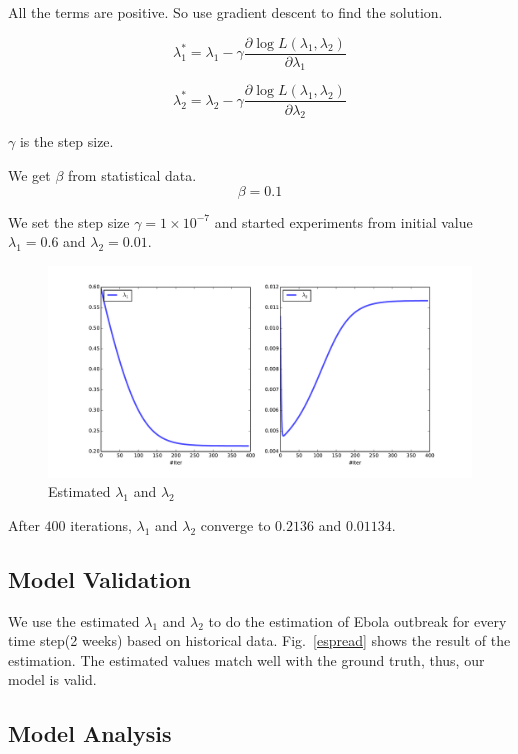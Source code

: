 \documentclass[12pt]{article}
\begin{document}
All the terms are positive. So use gradient descent to find the solution.

$$\lambda_1^* = \lambda_1 - \gamma \frac{\partial \log L(\lambda_1, \lambda_2)}{\partial \lambda_1}$$

$$\lambda_2^* = \lambda_2 - \gamma \frac{\partial \log L(\lambda_1, \lambda_2)}{\partial \lambda_2}$$

$\gamma$ is the step size.

We get $\beta$ from statistical data. $$\beta = 0.1$$ 

We set the step size $\gamma = 1\times 10^{-7}$ and started experiments from initial value $\lambda_1 = 0.6$ and $\lambda_2 = 0.01$.

\begin{figure}[hbt]
\begin{center}
  \includegraphics[width=6in]{graph/iter.pdf}
  \caption{Estimated $\lambda_1$ and $\lambda_2$}
  \label{est2}
\end{center}  
\end{figure}

After $400$ iterations, $\lambda_1$ and $\lambda_2$ converge to $0.2136$ and $0.01134$.

\subsection{Model Validation}

We use the estimated $\lambda_1$ and $\lambda_2$ to do the estimation of Ebola outbreak for every time step(2 weeks) based on historical data. Fig.~\ref{espread} shows the result of the estimation. The estimated values match well with the ground truth, thus, our model is valid.

\subsection{Model Analysis}
\end{document}

